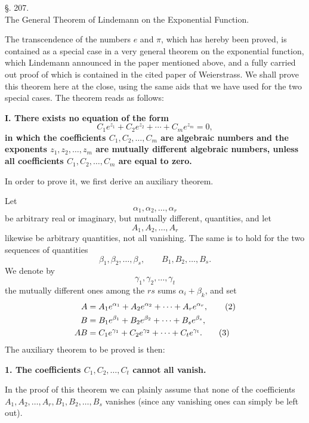 \documentclass[11pt]{article}
\begin{document}
\begin{center}
{\large §. 207.}\\[0.4em]
{\large The General Theorem of Lindemann on the Exponential Function.}
\end{center}

The transcendence of the numbers $e$ and $\pi$, which has hereby been proved, is contained as a special case in a very general theorem on the exponential function, which Lindemann announced in the paper mentioned above, and a fully carried out proof of which is contained in the cited paper of Weierstrass. We shall prove this theorem here at the close, using the same aids that we have used for the two special cases. The theorem reads as follows:

\textbf{I. There exists no equation of the form}
\begin{equation}\tag{1}
C_1e^{z_1}+C_2e^{z_2}+\cdots+C_me^{z_m}=0,
\end{equation}
\textbf{in which the coefficients $C_1,C_2,\ldots,C_m$ are algebraic numbers and the exponents $z_1,z_2,\ldots,z_m$ are mutually different algebraic numbers, unless all coefficients $C_1,C_2,\ldots,C_m$ are equal to zero.}

In order to prove it, we first derive an auxiliary theorem.

Let
\[
\alpha_1,\alpha_2,\ldots,\alpha_r
\]
be arbitrary real or imaginary, but mutually different, quantities, and let
\[
A_1,A_2,\ldots,A_r
\]
likewise be arbitrary quantities, not all vanishing. The same is to hold for the two sequences of quantities
\[
\beta_1,\beta_2,\ldots,\beta_s,\qquad
B_1,B_2,\ldots,B_s.
\]
We denote by
\[
\gamma_1,\gamma_2,\ldots,\gamma_t
\]
the mutually different ones among the $rs$ sums $\alpha_i+\beta_k$, and set
\begin{align}
A&=A_1e^{\alpha_1}+A_2e^{\alpha_2}+\cdots+A_re^{\alpha_r},\tag{2}\\
B&=B_1e^{\beta_1}+B_2e^{\beta_2}+\cdots+B_se^{\beta_s},\notag\\
AB&=C_1e^{\gamma_1}+C_2e^{\gamma_2}+\cdots+C_te^{\gamma_t}.\tag{3}
\end{align}
The auxiliary theorem to be proved is then:

\textbf{1. The coefficients $C_1,C_2,\ldots,C_t$ cannot all vanish.}

In the proof of this theorem we can plainly assume that none of the coefficients $A_1,A_2,\ldots,A_r,B_1,B_2,\ldots,B_s$ vanishes (since any vanishing ones can simply be left out).
\end{document}
